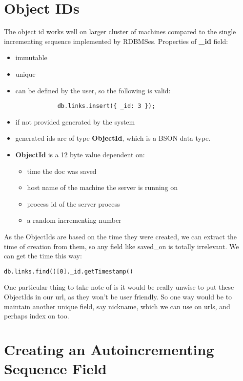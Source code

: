 \documentclass[a4paper, 12pt]{article}
\begin{document}
\section{Object IDs}
The object id works well on larger cluster of machines compared to the single incrementing sequence implemented by RDBMSes. Properties of \textbf{\_id} field:
\begin{itemize}
    \item immutable 
    \item unique
    \item can be defined by the user, so the following is valid:
        \begin{verbatim}
            db.links.insert({ _id: 3 });
        \end{verbatim}
    \item if not provided generated by the system
    \item generated ids are of type \textbf{ObjectId}, which is a BSON data type.
    \item \textbf{ObjectId} is a 12 byte value dependent on:
        \begin{itemize}
            \item time the doc was saved
            \item host name of the machine the server is running on
            \item process id of the server process
            \item a random incrementing number
        \end{itemize}
\end{itemize}
As the ObjectIds are based on the time they were created, we can extract the time of creation from them, so any field like saved\_on is totally irrelevant. We can get the time this way:
\begin{verbatim}
db.links.find()[0]._id.getTimestamp()
\end{verbatim}

One particular thing to take note of is it would be really unwise to put these ObjectIds in our url, as they won't be user friendly. So one way would be to maintain another unique field, say nickname, which we can use on urls, and perhaps index on too.

\section{Creating an Autoincrementing Sequence Field}
\end{document}
